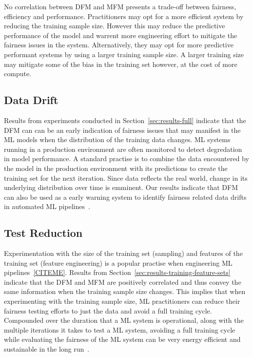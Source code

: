 \documentclass{article}
\begin{document}
No correlation between DFM and MFM presents a trade-off between
fairness, efficiency and performance. Practitioners may opt for a more
efficient system by reducing the training sample size. However this
may reduce the predictive performance of the model and warrent more
engineering effort to mitigate the fairness issues in the system.
Alternatively, they may opt for more predictive performant systems by
using a larger training sample size. A larger training size may
mitigate some of the bias in the training set however, at the cost of
more compute.

\subsection{Data Drift}\label{sec:discuss-data-drift}

Results from experiments conducted in Section \ref{sec:results-full}
indicate that the DFM can can be an early indication of fairness
issues that may manifest in the ML models when the distribution of the
training data changes. ML systems running in a production environment
are often monitored to detect degredation in model performance. A
standard practise is to combine the data encountered by the model in
the production environment with its predictions to create the training
set for the next iteration. Since data reflects the real world, change
in its underlying distribution over time is emminent. Our results
indicate that DFM can also be used as a early warning system to
identify fairness related data drifts in automated ML
pipelines \cite{CITEME}.

\subsection{Test Reduction}\label{sec:discuss-test-red}

Experimentation with the size of the training set (sampling) and
features of the training set (feature engineering) is a popular
practise when engineering ML pipelines \ref{CITEME}. Results from
Section \ref{sec:results-training-feature-sets} indicate that the DFM
and MFM are positively correlated and thus convey the same information
when the training sample size changes. This implies that when
experimenting with the training sample size, ML practitioners can
reduce their fairness testing efforts to just the data and avoid a
full training cycle. Compounded over the duration that a ML system is
operational, along with the multiple iterations it takes to test a ML
system, avoiding a full training cycle while evaluating the fairness
of the ML system can be very energy efficient and sustainable in the
long run \cite{CITME}.
\end{document}

